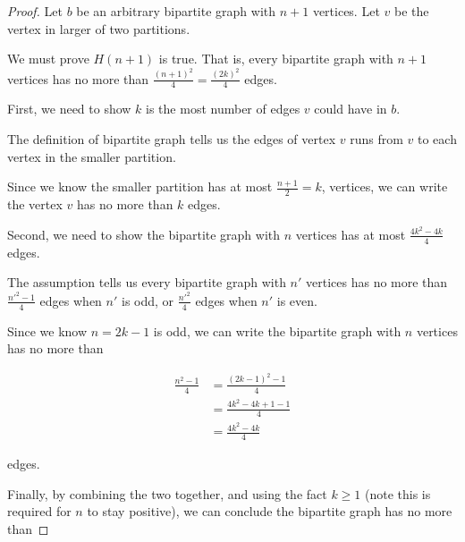 \documentclass[12pt]{article}
\begin{document}
\begin{enumerate}[a.]
\begin{proof}
        \bigskip

        Let $b$ be an arbitrary bipartite graph with $n+1$ vertices. Let
        $v$ be the vertex in larger of two partitions.

        \bigskip

        We must prove $H(n+1)$ is true. That is, every bipartite graph
        with $n+1$ vertices has no more than $\frac{(n+1)^2}{4} = \frac{(2k)^2}{4}$
        edges.

        \bigskip

        First, we need to show $k$ is the most number of edges $v$
        could have in $b$.

        \bigskip

        The definition of bipartite graph tells us the edges of vertex
        $v$ runs from $v$ to each vertex in the smaller partition.

        \bigskip

        Since we know the smaller partition has at most $\frac{n+1}{2} = k$,
        vertices, we can write the vertex $v$ has no more than $k$ edges.

        \bigskip

        Second, we need to show the bipartite graph with $n$ vertices has
        at most $\frac{4k^2-4k}{4}$ edges.

        \bigskip

        The assumption tells us every bipartite graph with $n'$ vertices
        has no more than $\frac{n'^2-1}{4}$ edges when $n'$ is odd, or
        $\frac{n'^2}{4}$ edges when $n'$ is even.

        \bigskip

        Since we know $n = 2k - 1$ is odd, we can write the bipartite
        graph with $n$ vertices has no more than

        \begin{align}
            \frac{n^2-1}{4} &= \frac{(2k-1)^2-1}{4}\\
            &= \frac{4k^2-4k+1-1}{4}\\
            &= \frac{4k^2-4k}{4}
        \end{align}

        edges.

        \bigskip

        Finally, by combining the two together, and using the fact $k \geq 1$
        (note this is required for $n$ to stay positive), we can
        conclude the bipartite graph has no more than


\end{proof}
\end{enumerate}
\end{document}
